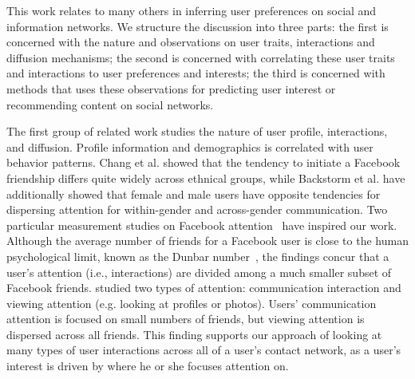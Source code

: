 

This work relates to many others in inferring user preferences on social and information networks. 
We structure the discussion into three parts: the first is concerned with the nature and observations on user traits, interactions and diffusion mechanisms; the second is concerned with correlating these user traits and interactions to user preferences and interests; %
the third is concerned with methods that uses these observations for predicting user interest or recommending content on social networks.

The first group of related work studies the nature of user profile, interactions, and diffusion.
Profile information and demographics is correlated with user behavior
patterns. Chang et al.\cite{Chang2010ethnicity} showed that the tendency to
initiate a Facebook friendship differs quite widely across ethnical
groups, while Backstorm et al.\cite{backstrom2011center} have additionally showed that female and male users have opposite tendencies for dispersing attention for within-gender and across-gender communication.
Two particular measurement studies on Facebook attention~\cite{wilson2009user,backstrom2011center} have inspired our work.  Although the average number of friends for a Facebook user is close to the human psychological limit, known as the Dunbar number~\cite{hill2003social}, the findings concur that a user's attention (i.e., interactions) are divided among a much smaller subset of Facebook friends. \cite{backstrom2011center} studied two types of attention: communication interaction and viewing attention (e.g. looking at profiles or photos). Users' communication attention is focused on small numbers of friends, but viewing attention is dispersed across all friends.
This finding supports our approach of looking at many types of user interactions across all of a user's contact network, as a user's interest is driven by where he or she focuses attention on.

